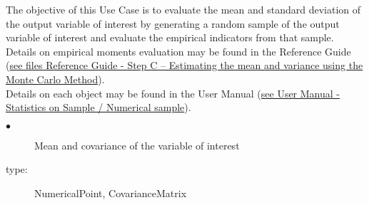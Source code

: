\renewcommand{\filename}{docUC_CentralUncertainty_MomentsEvaluation.tex}
\renewcommand{\filetitle}{UC : Moments evaluation of a random sample of the output variable of interest}

\HeaderIIILevel





The objective of this Use Case  is to evaluate the mean and standard deviation of the output variable of interest by generating a random sample of the output variable of interest and evaluate the empirical indicators from that sample.\\



Details on empirical moments evaluation  may be found in the Reference Guide (\href{OpenTURNS_ReferenceGuide.pdf}{see files Reference Guide - Step C -- Estimating the mean and variance using the Monte Carlo Method}).\\

Details on each object may be found in the User Manual  (\href{OpenTURNS_UserManual_TUI.pdf}{see User Manual - Statistics on Sample / Numerical sample}).\\

{
  \begin{description}
  \item[$\bullet$] Mean and covariance of the variable of interest
  \item[type:] NumericalPoint, CovarianceMatrix
  \end{description}
}

